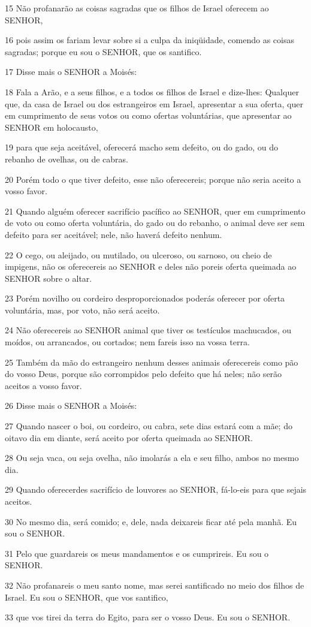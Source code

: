 \par 15 Não profanarão as coisas sagradas que os filhos de Israel oferecem ao SENHOR,
\par 16 pois assim os fariam levar sobre si a culpa da iniqüidade, comendo as coisas sagradas; porque eu sou o SENHOR, que os santifico.
\par 17 Disse mais o SENHOR a Moisés:
\par 18 Fala a Arão, e a seus filhos, e a todos os filhos de Israel e dize-lhes: Qualquer que, da casa de Israel ou dos estrangeiros em Israel, apresentar a sua oferta, quer em cumprimento de seus votos ou como ofertas voluntárias, que apresentar ao SENHOR em holocausto,
\par 19 para que seja aceitável, oferecerá macho sem defeito, ou do gado, ou do rebanho de ovelhas, ou de cabras.
\par 20 Porém todo o que tiver defeito, esse não oferecereis; porque não seria aceito a vosso favor.
\par 21 Quando alguém oferecer sacrifício pacífico ao SENHOR, quer em cumprimento de voto ou como oferta voluntária, do gado ou do rebanho, o animal deve ser sem defeito para ser aceitável; nele, não haverá defeito nenhum.
\par 22 O cego, ou aleijado, ou mutilado, ou ulceroso, ou sarnoso, ou cheio de impigens, não os oferecereis ao SENHOR e deles não poreis oferta queimada ao SENHOR sobre o altar.
\par 23 Porém novilho ou cordeiro desproporcionados poderás oferecer por oferta voluntária, mas, por voto, não será aceito.
\par 24 Não oferecereis ao SENHOR animal que tiver os testículos machucados, ou moídos, ou arrancados, ou cortados; nem fareis isso na vossa terra.
\par 25 Também da mão do estrangeiro nenhum desses animais oferecereis como pão do vosso Deus, porque são corrompidos pelo defeito que há neles; não serão aceitos a vosso favor.
\par 26 Disse mais o SENHOR a Moisés:
\par 27 Quando nascer o boi, ou cordeiro, ou cabra, sete dias estará com a mãe; do oitavo dia em diante, será aceito por oferta queimada ao SENHOR.
\par 28 Ou seja vaca, ou seja ovelha, não imolarás a ela e seu filho, ambos no mesmo dia.
\par 29 Quando oferecerdes sacrifício de louvores ao SENHOR, fá-lo-eis para que sejais aceitos.
\par 30 No mesmo dia, será comido; e, dele, nada deixareis ficar até pela manhã. Eu sou o SENHOR.
\par 31 Pelo que guardareis os meus mandamentos e os cumprireis. Eu sou o SENHOR.
\par 32 Não profanareis o meu santo nome, mas serei santificado no meio dos filhos de Israel. Eu sou o SENHOR, que vos santifico,
\par 33 que vos tirei da terra do Egito, para ser o vosso Deus. Eu sou o SENHOR.

